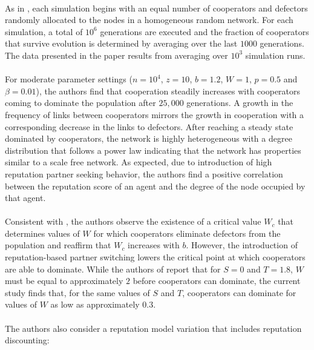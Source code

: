 \documentclass{article}
\begin{document}
	\paragraph{}As in \cite{Santos2006d}, each simulation begins with an equal number of cooperators and defectors randomly allocated to the nodes in a homogeneous random network.  For each simulation, a total of $10^6$ generations are executed and the fraction of cooperators that survive evolution is determined by averaging over the last $1000$ generations.  The data presented in the paper results from averaging over $10^3$ simulation runs.
	\paragraph{}For moderate parameter settings ($n=10^4$, $z=10$, $b=1.2$, $W=1$, $p=0.5$ and $\beta=0.01$), the authors find that cooperation steadily increases with cooperators coming to dominate the population after $25,000$ generations.  A growth in the frequency of links between cooperators mirrors the growth in cooperation with a corresponding decrease in the links to defectors.  After reaching a steady state dominated by cooperators, the network is highly heterogeneous with a degree distribution that follows a power law indicating that the network has properties similar to a scale free network.  As expected, due to introduction of high reputation partner seeking behavior, the authors find a positive correlation between the reputation score of an agent and the degree of the node occupied by that agent.
	\paragraph{}Consistent with \cite{Santos2006d}, the authors observe the existence of a critical value $W_c$ that determines values of $W$ for which cooperators eliminate defectors from the population and reaffirm that $W_c$ increases with $b$.  However, the introduction of reputation-based partner switching lowers the critical point at which cooperators are able to dominate. While the authors of \cite{Santos2006d} report that for $S=0$ and $T=1.8$, $W$ must be equal to approximately $2$ before cooperators can dominate, the current study finds that, for the same values of $S$ and $T$, cooperators can dominate for values of $W$ as low as approximately $0.3$.
	\paragraph{}The authors also consider a reputation model variation that includes reputation discounting:
	
\end{document}
